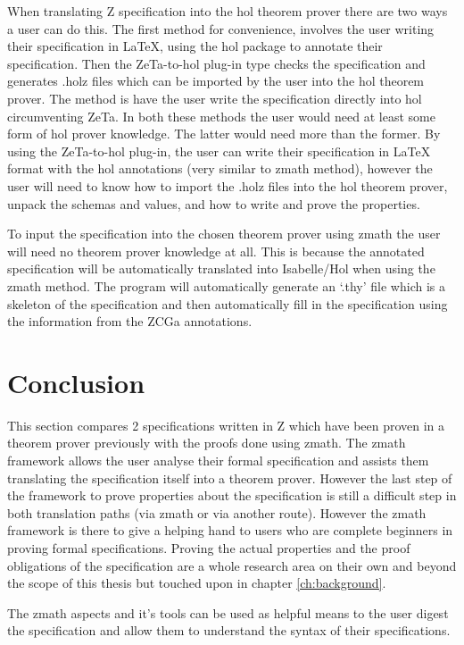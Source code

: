 When translating Z specification into the \gls{hol} theorem prover there are two
ways a user can do this. The first method for convenience, involves the user
writing their specification in \LaTeX{}, using the \gls{hol} package to annotate
their specification. Then the ZeTa-to-\gls{hol} plug-in type checks the
specification and generates .holz files which can be imported by the user into
the \gls{hol} theorem prover. The method is have the user write the
specification directly into \gls{hol} circumventing ZeTa. In both these methods
the user would need at least some form of \gls{hol} prover knowledge. The latter
would need more than the former. By using the ZeTa-to-\gls{hol} plug-in, the
user can write their specification in \LaTeX{} format with the \gls{hol}
annotations (very similar to \gls{zmath} method), however the user will need to
know how to import the .holz files into the \gls{hol} theorem prover, unpack the
schemas and values, and how to write and prove the properties.

To input the specification into the chosen theorem prover using \gls{zmath} the
user will need no theorem prover knowledge at all. This is because the annotated
specification will be automatically translated into Isabelle/Hol when using the
\gls{zmath} method. The program will automatically generate an `.thy' file which
is a skeleton of the specification and then automatically fill in the
specification using the information from the ZCGa annotations.

\section{Conclusion}
This section compares 2 specifications written in Z which have been proven in a
theorem prover previously with the proofs done using \gls{zmath}. The
\gls{zmath} framework allows the user analyse their formal specification and
assists them translating the specification itself into a theorem prover. However
the last step of the framework to prove properties about the specification is
still a difficult step in both translation paths (via \gls{zmath} or via another
route). However the \gls{zmath} framework is there to give a helping hand to
users who are complete beginners in proving formal specifications. Proving the
actual properties and the proof obligations of the specification are a whole
research area on their own and beyond the scope of this thesis but touched upon
in chapter \ref{ch:background}.

The \gls{zmath} aspects and it's tools can be used as helpful means to the user digest 
the specification and allow them to understand
the syntax of their specifications.

